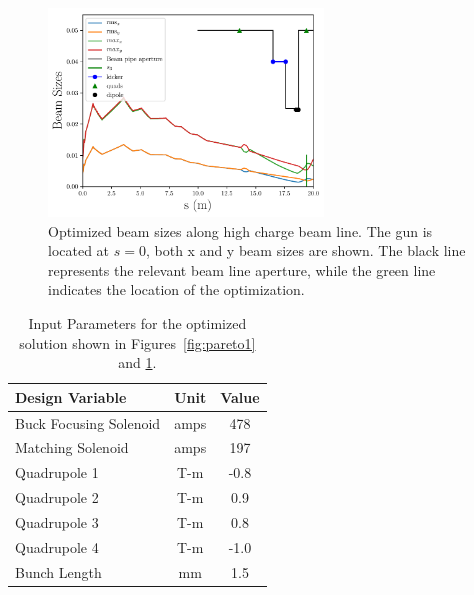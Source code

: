 \begin{figure}
	\includegraphics[width=0.65\textwidth]{figures/xy-max-min-sigma-paper}
	\caption{Optimized beam sizes along high charge beam line. The gun is located at $s=0$, 
	both x and y beam sizes are shown. The black line represents the relevant beam line aperture, while
	the green line indicates the location of the optimization.}
	\label{fig:stat}
\end{figure}
\begin{table}%
	\begin{center}
		\caption{Input Parameters for the optimized solution shown in Figures~\ref{fig:pareto1} and \ref{fig:stat}.}
		\label{tab:designopt}   
		\begin{tabular}{lcc}
			\toprule
			\textbf{Design Variable} \qquad \qquad & \textbf{Unit}	\quad&  \textbf{Value}  \\ 
			\midrule
			{Buck Focusing Solenoid} \qquad \qquad & amps	\quad & 478 \\
			Matching Solenoid &	amps	& 197	  \\
			Quadrupole 1& T-m		& -0.8	\\ 
			Quadrupole 2& T-m		& 0.9	\\
			Quadrupole 3 & T-m		& 0.8	\\
			Quadrupole 4 & T-m		& -1.0	\\ 
			Bunch Length & mm 		& 1.5	\\
			\bottomrule
		\end{tabular}
	\end{center}
\end{table}









